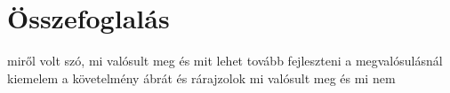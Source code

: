 \chapter{Összefoglalás}

miről volt szó, mi valósult meg és mit lehet tovább fejleszteni
a megvalósulásnál kiemelem a követelmény ábrát és rárajzolok mi valósult meg és mi nem